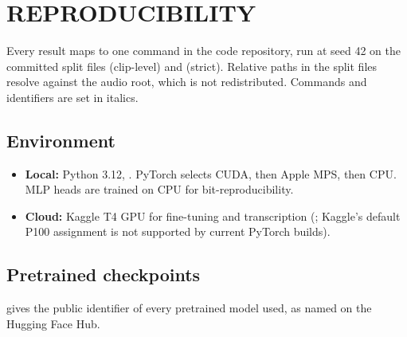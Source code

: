 \chapter{REPRODUCIBILITY}
\label{app:repro}

Every result maps to one command in the code repository, run at seed 42 on the
committed split files  (clip-level) and
 (strict). Relative paths in the
split files resolve against the audio root, which is not redistributed. Commands
and identifiers are set in italics.

\section{Environment}

\begin{itemize}
  \item \textbf{Local:} Python 3.12, .
        PyTorch selects CUDA, then Apple MPS, then CPU. MLP heads are trained on
        CPU for bit-reproducibility.
  \item \textbf{Cloud:} Kaggle T4 GPU for fine-tuning and transcription
        (; Kaggle's
        default P100 assignment is not supported by current PyTorch builds).
\end{itemize}

\section{Pretrained checkpoints}

 gives the public identifier of every pretrained model
used, as named on the Hugging Face Hub.

